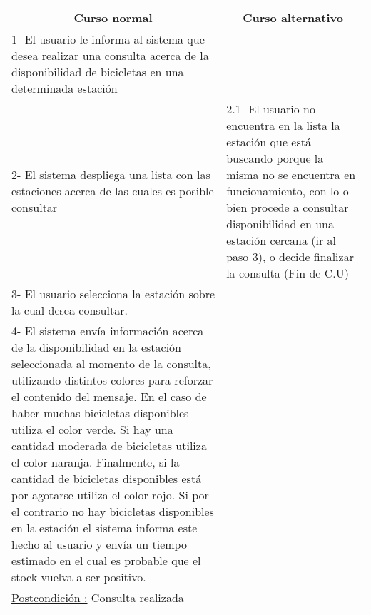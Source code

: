 \begin{center}
    \centering
    \begin{tabular}{ | p{11cm} | p{6cm} | }
    	\multicolumn{1}{c}{\cellcolor{black!30}\textbf{Curso normal}} & 
    	\multicolumn{1}{c}{\cellcolor{black!30}\textbf{Curso alternativo}} \\
		\hline
		1- El usuario le informa al sistema que desea realizar una consulta acerca de la disponibilidad
		de bicicletas en una determinada estación & \\ \hline
		2- El sistema despliega una lista con las estaciones acerca de las cuales es posible consultar & 
		2.1- El usuario no encuentra en la lista la estación que está buscando porque la misma no se encuentra en
		funcionamiento, con lo o bien procede a consultar disponibilidad en una estación cercana (ir al paso 3), o
		decide finalizar la consulta (Fin de C.U)\\ \hline
		3- El usuario selecciona la estación sobre la cual desea consultar. & \\ \hline
		4- El sistema envía información acerca de la disponibilidad en la estación seleccionada al momento de la consulta, utilizando distintos colores para reforzar el contenido del mensaje. En el caso de haber muchas bicicletas disponibles utiliza el color verde. Si hay una cantidad moderada de bicicletas utiliza el color naranja. Finalmente,
		si la cantidad de bicicletas disponibles está por agotarse utiliza el color rojo. Si por el contrario no hay
		bicicletas disponibles en la estación el sistema informa este hecho al usuario y envía un tiempo estimado en el cual
		es probable que el stock vuelva a ser positivo. & \\ \hline
		\underline{Postcondición :} Consulta realizada & \\ \hline
    \end{tabular}
\end{center}	

~

